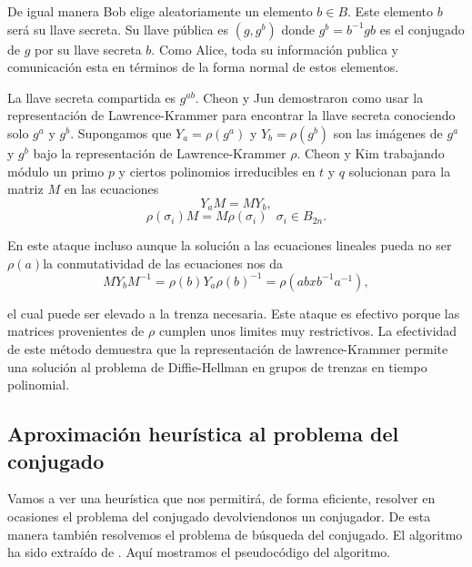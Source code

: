 \documentclass[12pt]{book}
\theoremstyle{definition}
\begin{document}
De igual manera Bob elige aleatoriamente un elemento $b\in B$. Este elemento $b$ será su llave secreta. Su llave pública es $(g,g^b)$ donde $g^b = b^{-1}gb$ es el conjugado de $g$ por su llave secreta $b$. Como Alice, toda su información publica y comunicación esta en términos de la forma normal de estos elementos.

La llave secreta compartida es $g^{ab}$. Cheon y Jun demostraron como usar la representación de Lawrence-Krammer para encontrar la llave secreta conociendo solo $g^a$ y $g^b$. Supongamos que $Y_a=\rho(g^a)$ y  $Y_b=\rho(g^b)$ son las imágenes de $g^a$ y $g^b$ bajo la representación de Lawrence-Krammer $\rho$. Cheon y Kim trabajando módulo un primo $p$ y ciertos polinomios irreducibles en $t$ y $q$ solucionan para la matriz $M$ en las ecuaciones
$$Y_aM=MY_b,$$
$$\rho(\sigma_i)M=M\rho(\sigma_i)\ \ \ \sigma_i\in B_{2n}.$$

En este ataque incluso aunque la solución a las ecuaciones lineales pueda no ser $\rho(a)$la conmutatividad de las ecuaciones nos da
$$MY_bM^{-1}=\rho(b)Y_a\rho(b)^{-1}=\rho(abxb^{-1}a^{-1}),$$

el cual puede ser elevado a la trenza necesaria. Este ataque es efectivo porque las matrices provenientes de $\rho$ cumplen unos limites muy restrictivos. La efectividad de este método demuestra que la representación de lawrence-Krammer permite una solución al problema de Diffie-Hellman en grupos de trenzas en tiempo polinomial.

\subsection{Aproximación heurística al problema del conjugado}
Vamos a ver una heurística que nos permitirá, de forma eficiente, resolver en ocasiones el problema del conjugado devolviendonos un conjugador. De esta manera también resolvemos el problema de búsqueda del conjugado. El algoritmo ha sido extraído de \cite{Att}. Aquí mostramos el pseudocódigo del algoritmo.
\newline
\end{document}
